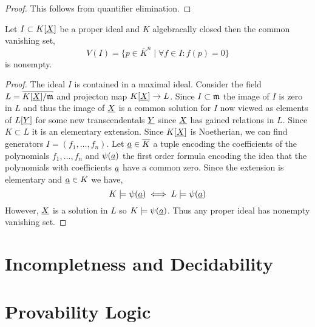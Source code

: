 \documentclass[12pt]{article}
\begin{document}
\begin{proof}
This follows from quantifier elimination.
\end{proof}

\begin{theorem}
Let $I \subset K[\underline{X}]$ be a proper ideal and $K$ algebracally closed then the common vanishing set,
\[ V(I) = \{p \in \bar{K}^n \mid \forall f \in I : f(p) = 0 \} \]
is nonempty. 
\end{theorem}

\begin{proof}
The ideal $I$ is contained in a maximal ideal. Consider the field $L = \overline{K[\underline{X}] / \mathfrak{m}}$ and projecton map $K[\underline{X}] \to L$. Since $I \subset \mathfrak{m}$ the image of $I$ is zero in $L$ and thus the image of $\underline{X}$ is a common solution for $I$ now viewed as elements of $L[\underline{Y}]$ for some new transcendentals $\underline{Y}$ since $\underline{X}$ has gained relations in $L$. Since $K \subset L$ it is an elementary extension.
Since $K[\underline{X}]$ is Noetherian, we can find generators $I = (f_1, \dots, f_n)$. Let $\underline{a} \in \overline{K}$ a tuple encoding the coefficients of the polynomials $f_1, \dots, f_n$ and $\psi(\underline{a})$ the first order formula encoding the idea that the polynomials with coefficients $\underline{a}$ have a common zero. Since the extension is elementary and $\underline{a} \in K$ we have,
\[ K \models \psi(\underline{a}) \iff L \models \psi(\underline{a}) \]
However, $\underline{X}$ is a solution in $L$ so $K \models \psi(\underline{a})$. Thus any proper ideal has nonempty vanishing set. 
\end{proof}

\section{Incompletness and Decidability}

\section{Provability Logic}
\end{document}
